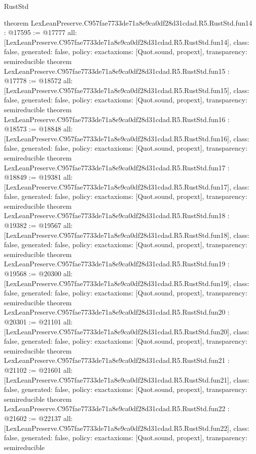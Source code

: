 \begin{lexlean}{RustStd}
\begin{coremodule}
{}
theorem LexLeanPreserve.C957fae7733de71a8e9ca0df28d31cdad.R5.RustStd.fun14 : @17595 := @17777 {
  all: [LexLeanPreserve.C957fae7733de71a8e9ca0df28d31cdad.R5.RustStd.fun14],
  class: false,
  generated: false,
  policy: exact{axioms: [Quot.sound, propext]},
  transparency: semireducible
}
theorem LexLeanPreserve.C957fae7733de71a8e9ca0df28d31cdad.R5.RustStd.fun15 : @17778 := @18572 {
  all: [LexLeanPreserve.C957fae7733de71a8e9ca0df28d31cdad.R5.RustStd.fun15],
  class: false,
  generated: false,
  policy: exact{axioms: [Quot.sound, propext]},
  transparency: semireducible
}
theorem LexLeanPreserve.C957fae7733de71a8e9ca0df28d31cdad.R5.RustStd.fun16 : @18573 := @18848 {
  all: [LexLeanPreserve.C957fae7733de71a8e9ca0df28d31cdad.R5.RustStd.fun16],
  class: false,
  generated: false,
  policy: exact{axioms: [Quot.sound, propext]},
  transparency: semireducible
}
theorem LexLeanPreserve.C957fae7733de71a8e9ca0df28d31cdad.R5.RustStd.fun17 : @18849 := @19381 {
  all: [LexLeanPreserve.C957fae7733de71a8e9ca0df28d31cdad.R5.RustStd.fun17],
  class: false,
  generated: false,
  policy: exact{axioms: [Quot.sound, propext]},
  transparency: semireducible
}
theorem LexLeanPreserve.C957fae7733de71a8e9ca0df28d31cdad.R5.RustStd.fun18 : @19382 := @19567 {
  all: [LexLeanPreserve.C957fae7733de71a8e9ca0df28d31cdad.R5.RustStd.fun18],
  class: false,
  generated: false,
  policy: exact{axioms: [Quot.sound, propext]},
  transparency: semireducible
}
theorem LexLeanPreserve.C957fae7733de71a8e9ca0df28d31cdad.R5.RustStd.fun19 : @19568 := @20300 {
  all: [LexLeanPreserve.C957fae7733de71a8e9ca0df28d31cdad.R5.RustStd.fun19],
  class: false,
  generated: false,
  policy: exact{axioms: [Quot.sound, propext]},
  transparency: semireducible
}
theorem LexLeanPreserve.C957fae7733de71a8e9ca0df28d31cdad.R5.RustStd.fun20 : @20301 := @21101 {
  all: [LexLeanPreserve.C957fae7733de71a8e9ca0df28d31cdad.R5.RustStd.fun20],
  class: false,
  generated: false,
  policy: exact{axioms: [Quot.sound, propext]},
  transparency: semireducible
}
theorem LexLeanPreserve.C957fae7733de71a8e9ca0df28d31cdad.R5.RustStd.fun21 : @21102 := @21601 {
  all: [LexLeanPreserve.C957fae7733de71a8e9ca0df28d31cdad.R5.RustStd.fun21],
  class: false,
  generated: false,
  policy: exact{axioms: [Quot.sound, propext]},
  transparency: semireducible
}
theorem LexLeanPreserve.C957fae7733de71a8e9ca0df28d31cdad.R5.RustStd.fun22 : @21602 := @22137 {
  all: [LexLeanPreserve.C957fae7733de71a8e9ca0df28d31cdad.R5.RustStd.fun22],
  class: false,
  generated: false,
  policy: exact{axioms: [Quot.sound, propext]},
  transparency: semireducible
}
\end{coremodule}
\end{lexlean}
